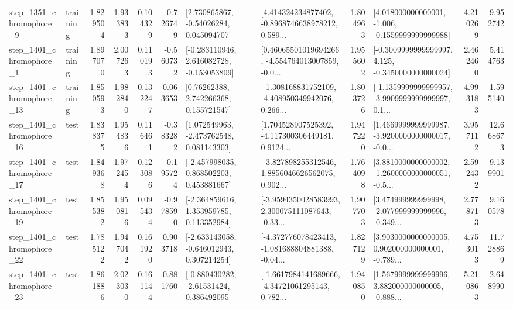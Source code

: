 \begin{tabular}{llrrrrllrlrr}
  step\_1351\_chromophore\_9 &  training &      1.829504 &    1.933833 &      0.104329 & -0.726749 &     [2.730865867, -0.54026284, 0.045094707] &  [4.414324234877402, -0.8968746638978212, 0.589... &       1.804963 &   [4.018000000000001, -1.006, -0.1559999999999988] &            4.210269 &          9.952742 \\
  step\_1401\_chromophore\_1 &  training &      1.897070 &    2.007263 &      0.110193 & -0.560732 &   [-0.283110946, 2.616082728, -0.153053809] &  [0.46065501019694266, -4.554764013007859, -0.0... &       1.955602 &  [-0.3009999999999997, 4.125, -0.3450000000000024] &            2.462460 &          5.414763 \\
 step\_1401\_chromophore\_13 &  training &      1.850593 &    1.982840 &      0.132247 &  0.063653 &      [0.76262388, 2.742266368, 0.155721547] &  [-1.308168831752109, -4.408950349942076, 0.266... &       1.803726 &  [-1.1359999999999957, -3.9909999999999997, 0.1... &            4.993183 &          1.595140 \\
 step\_1401\_chromophore\_16 &      test &      1.838375 &    1.954836 &      0.116461 & -0.383282 &    [1.072549963, -2.473762548, 0.081143303] &  [1.704528907525392, -4.117300306449181, 0.9124... &       1.947220 &  [1.4669999999999987, -3.9200000000000017, -0.0... &            3.957112 &         12.668673 \\
 step\_1401\_chromophore\_17 &      test &      1.849368 &    1.972454 &      0.123086 & -0.195724 &    [-2.457998035, 0.868502203, 0.453881667] &  [-3.827898255312546, 1.8856046626562075, 0.902... &       1.764098 &  [3.8810000000000002, -1.2600000000000051, -0.5... &            2.592432 &          9.139901 \\
 step\_1401\_chromophore\_19 &      test &      1.855382 &    1.950816 &      0.095434 & -0.978590 &    [-2.364859616, 1.353959785, 0.113352984] &  [-3.9594350028583993, 2.300075111087643, -0.33... &       1.907703 &  [3.474999999999998, -2.077999999999996, -0.349... &            2.778713 &          9.160578 \\
 step\_1401\_chromophore\_22 &      test &      1.785122 &    1.947042 &      0.161920 &  0.903718 &   [-2.633143058, -0.646012943, 0.307214254] &  [-4.372776078423413, -1.081688804881388, -0.04... &       1.827129 &  [3.9030000000000005, 0.902000000000001, -0.789... &            4.753013 &         11.728869 \\
 step\_1401\_chromophore\_23 &      test &      1.861886 &    2.023030 &      0.161144 &  0.881760 &    [-0.880430282, -2.61531424, 0.386492095] &  [-1.6617984141689666, -4.34721061295143, 0.782... &       1.940850 &  [1.5679999999999996, 3.882000000000005, -0.888... &            5.210863 &          2.648990 \\

\end{tabular}

